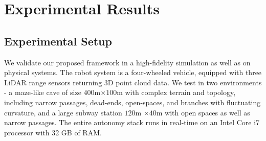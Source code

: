 \documentclass{article}
\newcommand{\ph}[1]{{\textbf{#1}:}} %
\begin{document}

\section{Experimental Results}\label{sec:exp_results}









\subsection{Experimental Setup}





We validate our proposed framework in a high-fidelity simulation as well as on physical systems. The robot system is a four-wheeled vehicle, equipped with three LiDAR range sensors returning 3D point cloud data. We test in two environments - a maze-like cave of size $400$m$ \times 100$m with complex terrain and topology, including narrow passages, dead-ends, open-spaces, and branches with fluctuating curvature, and a large subway station $120$m $\times 40$m with open spaces as well as narrow passages.  The entire autonomy stack runs in real-time on an Intel Core i7 processor with 32 GB of RAM.
\end{document}
